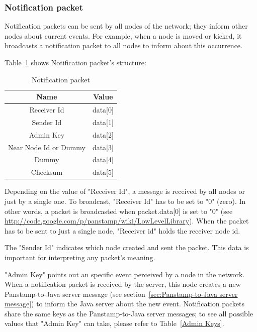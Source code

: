 \subsubsection{Notification packet}
\label{sec:Notification packet}
Notification packets can be sent by all nodes of the network; they inform other nodes about current events. 
For example, when a node is moved or kicked, it broadcasts a notification packet to all nodes to inform about this occurrence. 

Table~\ref{Notification-packet} shows Notification packet's structure:

\begin{table}[h]
  \centering
  \begin{tabular}{ c | c }
    \hline
    \textbf{Name} & \textbf{Value}\\ [0.5ex]    
    \hline
    Receiver Id & data[0] \\
    Sender Id & data[1] \\
    Admin Key & data[2]\\
    Near Node Id or Dummy & data[3]\\
    Dummy & data[4]\\ 
    Checksum & data[5]\\		 
    \hline
  \end{tabular}
  \caption[Notification packet]%
          {Notification packet}
  \label{Notification-packet}
\end{table}

Depending on the value of "Receiver Id", a message is received by all nodes or just by a single one. To broadcast, "Receiver Id" has to be set to "0" (zero). In other words, a packet is broadcasted when packet.data[0] is set to "0" (see \url{http://code.google.com/p/panstamp/wiki/LowLevelLibrary}).
When the packet has to be sent to just a single node, "Receiver id" holds the receiver node id.

The "Sender Id" indicates which node created and sent the packet. This data is important for interpreting any packet's meaning.

"Admin Key" points out an specific event perceived by a node in the network. When a notification packet is received by the server, this node creates a new Panstamp-to-Java server message (see section~\ref{sec:Panstamp-to-Java server message}) to inform the Java server about the new event. Notification packets share the same keys as the Panstamp-to-Java server messages; to see all possible values that "Admin Key" can take, please refer to Table~\ref{Admin Keys}. 

